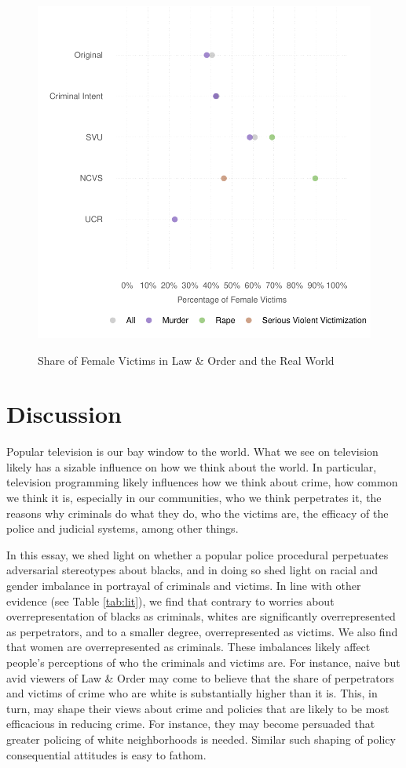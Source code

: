 \documentclass[12pt, letterpaper]{article}
\begin{document}
\begin{figure}[htbp]
\centering
\caption{Share of Female Victims in Law \& Order and the Real World}
\includegraphics[scale=.9]{../figs/all_victims_by_gender.pdf}
\label{fig:victim_sex}
\end{figure}

\section*{Discussion}
Popular television is our bay window to the world. What we see on television likely has a sizable influence on how we think about the world. In particular, television programming likely influences how we think about crime, how common we think it is, especially in our communities, who we think perpetrates it, the reasons why criminals do what they do, who the victims are, the efficacy of the police and judicial systems, among other things. 

In this essay, we shed light on whether a popular police procedural perpetuates adversarial stereotypes about blacks, and in doing so shed light on racial and gender imbalance in portrayal of criminals and victims. In line with other evidence (see Table \ref{tab:lit}), we find that contrary to worries about overrepresentation of blacks as criminals, whites are significantly overrepresented as perpetrators, and to a smaller degree, overrepresented as victims. We also find that women are overrepresented as criminals. These imbalances likely affect people's perceptions of who the criminals and victims are. For instance, naive but avid viewers of Law \& Order may come to believe that the share of perpetrators and victims of crime who are white is substantially higher than it is. This, in turn, may shape their views about crime and policies that are likely to be most efficacious in reducing crime. For instance, they may become persuaded that greater policing of white neighborhoods is needed. Similar such shaping of policy consequential attitudes is easy to fathom. 
\end{document}
